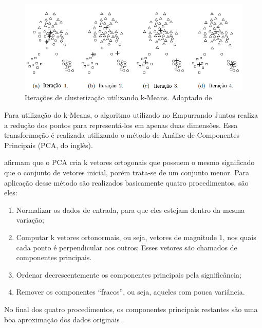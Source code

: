 \begin{figure}[h!]
\centering
\includegraphics[scale=0.6]{figuras/iteracoes_kmeans.png}
\caption{Iterações de clusterização utilizando k-Means. Adaptado de }
\label{fig:iteracoes_kmeans}
\end{figure}

\pagebreak

Para utilização do k-Means, o algoritmo utilizado no Empurrando Juntos realiza a redução dos pontos para 
representá-los em apenas duas dimensões. Essa transformação é realizada utilizando o método de Análise de 
Componentes Principais (PCA, do inglês). 

 afirmam que o PCA cria k vetores ortogonais que possuem o mesmo significado que o conjunto
de vetores inicial, porém trata-se de um conjunto menor. Para aplicação desse método são realizados basicamente quatro procedimentos, são eles:

\begin{enumerate}
 \item Normalizar os dados de entrada, para que eles estejam dentro da mesma variação;
 \item Computar k vetores ortonormais, ou seja, vetores de magnitude 1, nos quais cada ponto é perpendicular aos outros;
  \subitem Esses vetores são chamados de componentes principais.
 \item Ordenar decrescentemente os componentes principais pela significância;
 \item Remover os componentes ``fracos'', ou seja, aqueles com pouca variância.
\end{enumerate}

No final dos quatro procedimentos, os componentes principais restantes são uma boa aproximação dos dados originais \cite{han2011data}.



